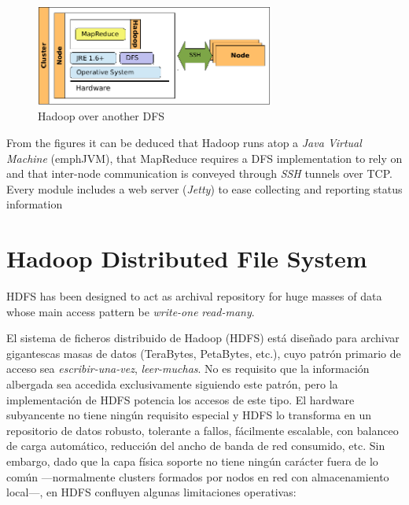 \begin{figure}[tbp]
\begin{center}
\includegraphics[width=0.7\textwidth]{imagenes/016.pdf}
 \caption{Hadoop over another DFS}
\label{fig:hadoopmapreddfs}
\end{center}
\end{figure}

From the figures it can be deduced that Hadoop runs atop a \emph{Java Virtual Machine} (emph{JVM}), that MapReduce requires a DFS implementation to rely on and that inter-node communication is conveyed through \emph{SSH} tunnels over TCP. Every module includes a web server (\emph{Jetty}) to ease collecting and reporting status information

\section{Hadoop Distributed File System}\label{sec:hdfs}
\noindent HDFS has been designed to act as archival repository for huge masses of data whose main access pattern be \emph{write-one} \emph{read-many}.

\noindent El sistema de ficheros distribuido de Hadoop (HDFS) est\'a dise\~nado para archivar gigantescas masas de datos (TeraBytes, PetaBytes, etc.), cuyo patr\'on primario de acceso sea \emph{escribir-una-vez}, \emph{leer-muchas}. No es requisito que la informaci\'on albergada sea accedida exclusivamente siguiendo este patr\'on, pero la implementaci\'on de HDFS potencia los accesos de este tipo. El hardware subyancente no tiene ning\'un requisito especial y HDFS lo transforma en un repositorio de datos robusto, tolerante a fallos, f\'acilmente escalable, con balanceo de carga autom\'atico, reducci\'on del ancho de banda de red consumido, etc. Sin embargo, dado que la capa f\'isica soporte no tiene ning\'un car\'acter fuera de lo com\'un ---normalmente clusters formados por nodos en red con almacenamiento local---, en HDFS confluyen algunas limitaciones operativas:

